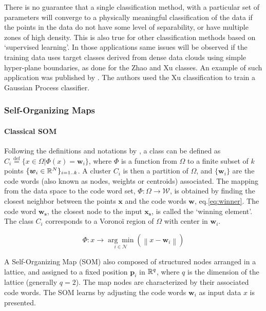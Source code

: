 There is no guarantee that a single classification method, with a particular set of parameters will converge to a physically meaningful classification of the data if the points in the data do not have some level of separability, or have multiple zones of high density. This is also true for other classification methods based on `supervised learning'. In those applications same issues will be observed if the training data uses target classes derived from dense data clouds using simple hyper-plane boundaries, as done for the Zhao and Xu classes. An example of such application was published by \citep{Camporeale2017b}. The authors used the Xu classification to train a Gaussian Process classifier.

\subsubsection{Self-Organizing Maps}
\label{sec:som}

\paragraph{Classical SOM}

Following the definitions and notations by \citep{Villmann2006}, a class can be defined as $C_i\overset{\text{def}}{=} \{x\in\Omega | \Phi(x)=\boldsymbol{w}_i\}$, where $\Phi$ is a function from $\Omega$ to a finite subset of $k$ points $\{\boldsymbol{w}_i\in\Bbb R^N\}_{i=1..k}$. A cluster $C_i$ is then a partition of $\Omega$, and $\{\boldsymbol{w}_i\}$ are the code words (also known as nodes, weights or centroids) associated. The mapping from the data space to the code word set, $\Phi: \Omega\rightarrow\mathcal{W}$, is obtained by finding the closest neighbor between the points $\boldsymbol{x}$ and the code words $\boldsymbol{w}$, eq.\eqref{eq:winner}. The code word $\boldsymbol{w_s}$, the closest node to the input $\boldsymbol{x_s}$, is called the `winning element'. The class $C_i$ corresponds to a Vorono\"i region of $\Omega$ with center in $\boldsymbol{w}_i$.

\begin{equation}
\Phi: x \rightarrow  \underset{i\in\mathcal{N}}{\arg\min}\left( \left\lVert x - \boldsymbol{w}_i \right\rVert \right) \label{eq:winner}
\end{equation}

A Self-Organizing Map (SOM) also composed of structured nodes arranged in a lattice, and assigned to a fixed position $\boldsymbol{p}_i$ in $\Bbb R^q$, where $q$ is the dimension of the lattice (generally $q=2$). The map nodes are characterized by their associated code words. The SOM learns by adjusting the code words $\boldsymbol{w}_i$ as input data $x$ is presented.

